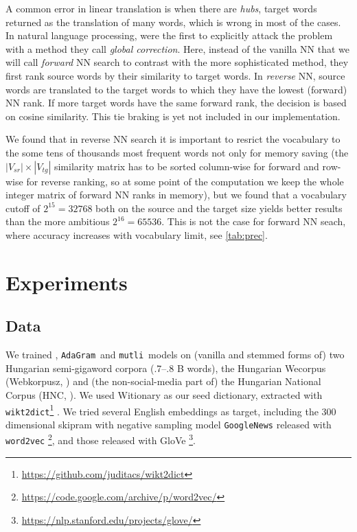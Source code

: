 \documentclass[11pt]{article}
\newcommand{\neelakantan}{\cite{Neelakantan:2014}}
\newcommand{\adagram}{\texttt{AdaGram}}
\newcommand{\mutli}{\texttt{mutli}}
\begin{document}
A common error in linear translation is when there are \emph{hubs}, target
words returned as the translation of many words, which is wrong in most of the
cases.  In natural language processing, \cite{Dinu:2015} were the first to
explicitly attack the problem with a method they call \emph{global correction}.
Here, instead of the vanilla NN that we will call \emph{forward} NN search to
contrast with the more sophisticated method, they first rank source words by
their similarity to target words. In \emph{reverse} NN, source words are
translated to the target words to which they have the lowest (forward) NN rank.
\todo{} If more target words have the same forward rank, the decision is based
on cosine similarity. This tie braking is yet not included in our
implementation.

We found that in reverse NN search it is important to resrict the vocabulary to
the some tens of thousands most frequent words not only for memory saving (the
$|V_{sr}|\times|V_{tg}|$ similarity matrix has to be sorted column-wise for
forward and row-wise for reverse ranking, so at some point of the computation
we keep the whole integer matrix of forward NN ranks in memory), but we found
that a vocabulary cutoff of $2^{15}=32768$ both on the source and the target
size yields better results than the more ambitious $2^{16}=65536$. This is not
the case for forward NN seach, where accuracy increases with vocabulary limit,
see \cref{tab:prec}.

\section{Experiments}

\subsection{Data}

We trained \neelakantan, \adagram~and \mutli~models on (vanilla and stemmed
forms of) two Hungarian semi-gigaword corpora (.7--.8 B words), the Hungarian
Wecorpus (Webkorpusz, \cite{Halacsy:2004}) and (the non-social-media part of) the
Hungarian National Corpus (HNC, \cite{Oravecz:2014}).  We used Witionary as our
seed dictionary, extracted with
\texttt{wikt2dict}\footnote{\url{https://github.com/juditacs/wikt2dict}}
\citep{Acs:2013}. We tried several English embeddings as target, including the
300 dimensional skipram with negative sampling model
\texttt{GoogleNews} released with \texttt{word2vec}
\citep{Mikolov:2013f}\footnote{\url{https://code.google.com/archive/p/word2vec/}},
and those released with GloVe
\citep{Pennington:2014}\footnote{\url{https://nlp.stanford.edu/projects/glove/}}.
\end{document}
